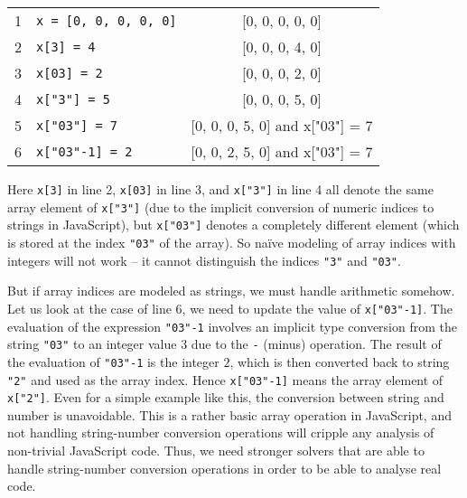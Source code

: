 \documentclass[sigplan,review,anonymous]{acmart}\settopmatter{printfolios=true,printccs=false,printacmref=false}
\begin{document}
\medskip
\hspace{-4mm}\begin{tabular}{l|l|c}
1&	{\tt{x = [0, 0, 0, 0, 0]}} & [0, 0, 0, 0, 0] \\
2&	{\tt{x[3] = 4}} & [0, 0, 0, 4, 0] \\
3&	{\tt{x[03] = 2}} & [0, 0, 0, 2, 0] \\
4&	{\tt{x["3"] = 5}} & [0, 0, 0, 5, 0] \\
5&	{\tt{x["03"] = 7}} & [0, 0, 0, 5, 0] and x["03"] = 7\\
6&	{\tt{x["03"-1] = 2}} & [0, 0, 2, 5, 0] and x["03"] = 7\\
\end{tabular}
\medskip

Here \texttt{x[3]} in line 2, \texttt{x[03]} in line 3, and \texttt{x["3"]} in line 4 all denote the same array element of \texttt{x["3"]} (due to the implicit conversion of numeric indices to strings in JavaScript), but \texttt{x["03"]} denotes a completely different element (which is stored at the index \texttt{"03"} of the array). So na\"ive modeling of array indices with integers will not work -- it cannot distinguish the indices \texttt{"3"} and \texttt{"03"}. 

But if array indices are modeled as strings, we must handle arithmetic somehow. Let us look at the case of line 6, we need to update the value of \texttt{x["03"-1]}. The evaluation of the expression \texttt{"03"-1} involves an implicit type conversion from the string \texttt{"03"} to an integer value $3$ due to the \texttt{-} (minus) operation. The result of the evaluation of \texttt{"03"-1} is the integer $2$, which is then converted back to string \texttt{"2"} and used as the array index. Hence \texttt{x["03"-1]} means the array element of \texttt{x["2"]}. Even for a simple example like this, the conversion between string and number is unavoidable. This is a rather basic   array operation in JavaScript, and not  handling string-number conversion operations will cripple any analysis of non-trivial JavaScript code. Thus, we need stronger solvers that are  able to handle string-number conversion operations in order to be able to analyse  real code. 
\end{document}
